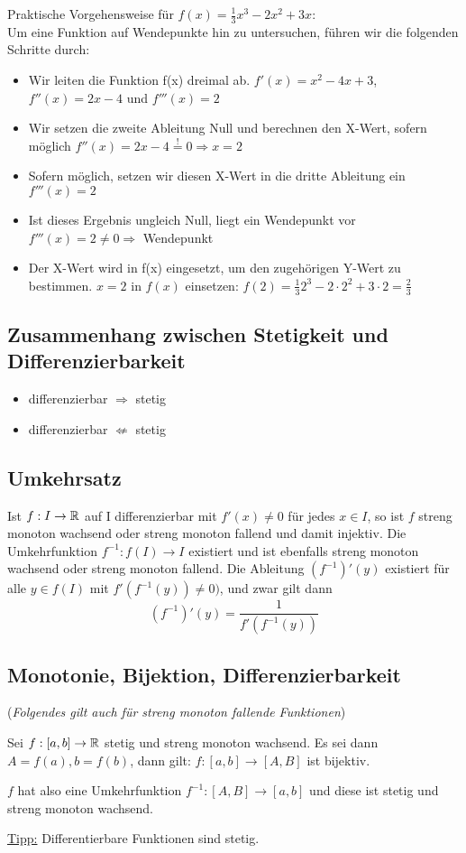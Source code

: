 Praktische Vorgehensweise für $f(x) = \frac{1}{3}x^3-2x^2+3x$:\\
Um eine Funktion auf Wendepunkte hin zu untersuchen, führen wir die folgenden Schritte durch:
\begin{itemize}
	\item Wir leiten die Funktion f(x) dreimal ab. $f'(x) = x^2-4x+3$, $f''(x) = 2x-4$ und $f'''(x) = 2$
	\item Wir setzen die zweite Ableitung Null und berechnen den X-Wert, sofern möglich  
		$f''(x) = 2x-4 \stackrel{!}{=} 0 \Rightarrow x = 2$ 
	\item Sofern möglich, setzen wir diesen X-Wert in die dritte Ableitung ein
		$f'''(x) = 2$
	\item Ist dieses Ergebnis ungleich Null, liegt ein Wendepunkt vor
		$f'''(x) = 2 \not= 0 \Rightarrow$ Wendepunkt
	\item Der X-Wert wird in f(x) eingesetzt, um den zugehörigen Y-Wert zu bestimmen.
		$x = 2$ in $f(x)$ einsetzen: $f(2) = \frac{1}{3}2^3-2\cdot2^2+3\cdot2 = \frac{2}{3}$
\end{itemize}

\subsection{Zusammenhang zwischen Stetigkeit und Differenzierbarkeit}
\begin{itemize}
	\item differenzierbar $\Rightarrow$ stetig
	\item differenzierbar $\not\Leftarrow$ stetig
\end{itemize}

\subsection{Umkehrsatz}
Ist $f:I \to \mathbb{R}$ auf I differenzierbar mit $f'(x) \neq 0$ für jedes $x \in I$,
so ist $f$ streng monoton wachsend oder streng monoton fallend und damit
injektiv. Die Umkehrfunktion $f^{-1}:f(I) \to I$ existiert und ist ebenfalls
streng monoton wachsend oder streng monoton fallend. Die Ableitung
$(f^{-1})'(y)$ existiert für alle $y \in f(I)$ mit $f'(f^{-1}(y)) \neq 0)$, und zwar gilt dann \[ (f^{-1})'(y) = \frac{1}{f'(f^{-1}(y))}
\]

\subsection{Monotonie, Bijektion, Differenzierbarkeit}
\begin{satz}
(\textit{Folgendes gilt auch für streng monoton fallende Funktionen})

Sei $f: [a, b] \to \mathbb{R}$ stetig und streng monoton wachsend. Es sei dann
$A = f(a), b = f(b)$, dann gilt: $f: [a,b] \to [A, B]$ ist bijektiv.

$f$ hat also eine Umkehrfunktion $f^{-1}: [A,B] \to [a,b]$ und diese ist stetig
und streng monoton wachsend.
\end{satz}

\underline{Tipp:} Differentierbare Funktionen sind stetig.
